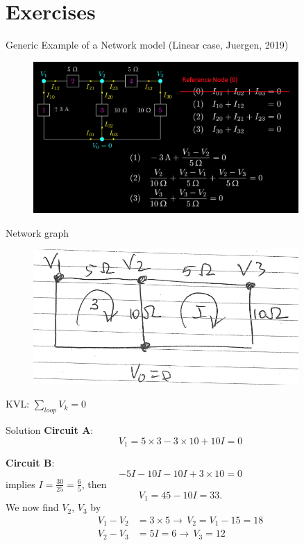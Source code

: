 \documentclass[xcolor=dvipsnames]{beamer}
\begin{document}
\section{Exercises}
\begin{frame}{Generic Example of a Network model (Linear case, Juergen, 2019)}
     	     \begin{figure}[!ht]
  			\centering
    		\includegraphics[width=0.9\textwidth]{slide31.png}
    		\label{fig:juergen1}
    	 \end{figure}
\end{frame}

\begin{frame}{Network graph}
     	 \begin{figure}[!ht]
  			\centering
    		\includegraphics[width=0.9\textwidth]{circuitj.png}
    		\label{fig:juergen2}
    	 \end{figure}	
KVL: 	$\sum_{loop} V_k = 0$
\end{frame}

\begin{frame}{Solution}
	\textbf{Circuit A}:
\[	V_1 = 5\times 3 - 3\times 10 +10 I =0 \]

	\textbf{Circuit B}:
\[	-5I - 10 I -10 I +3\times 10 =0 \]
implies $I=\frac{30}{25}=\frac{6}{5}$, then
\[V_1 = 45 - 10I=33.\]
We now find $V_2$, $V_3$ by 
\begin{align*}
	V_1 - V_2 &= 3\times 5 \rightarrow\, V_2 = V_1 - 15 = 18\\
	V_2 - V_3 &= 5I = 6 \rightarrow\, V_3 = 12
\end{align*}
\end{frame}
\end{document}
